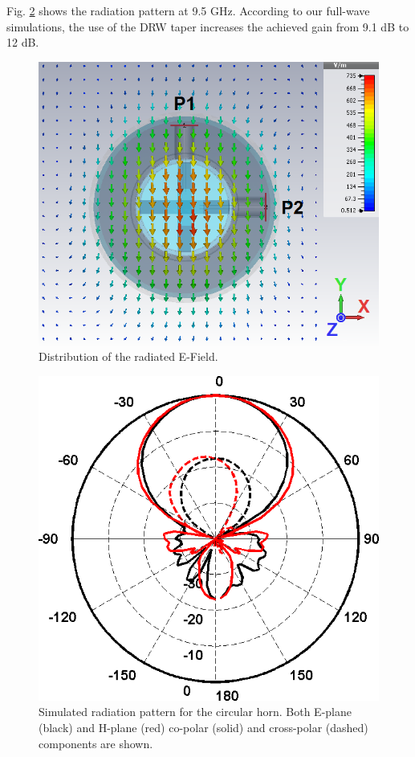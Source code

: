 \documentclass{IEEEtran}
\begin{document}
Fig. \ref{fig:DR_HORN} shows the radiation pattern at 9.5 GHz. According to our full-wave simulations, the use of the DRW taper increases the achieved gain from 9.1 dB to 12 dB. 

\begin{figure}[h]
	\centerline{\includegraphics[width=0.9\columnwidth]{images/FieldDistribution.png}}
	\caption{Distribution of the radiated E-Field.}
	\label{fig:RadiatedMode}
\end{figure}

\begin{figure}[h]
	\centerline{\includegraphics[width=0.65\columnwidth]{images/DR_Horn.png}}
	\caption{Simulated radiation pattern for the circular horn. Both E-plane (black) and H-plane (red) co-polar (solid) and cross-polar (dashed) components are shown.}
	\label{fig:DR_HORN}
\end{figure}
\end{document}
